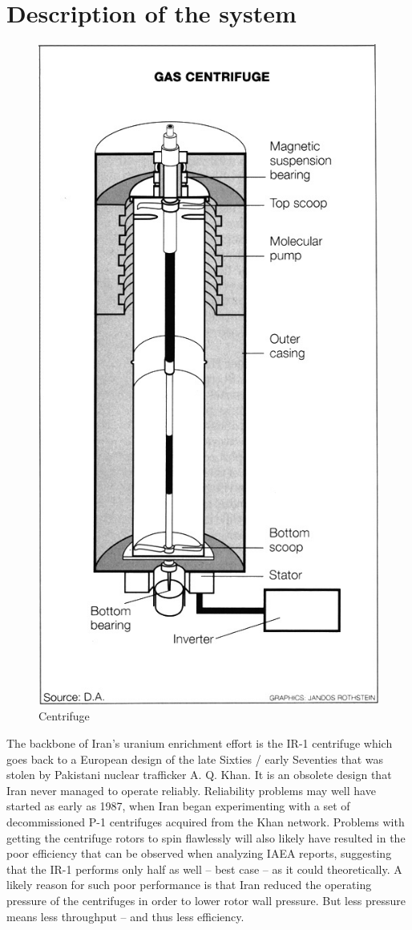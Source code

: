 \documentclass[12pt]{article}
\begin{document}
\section{Description of the system}
    \begin{figure}[H]
    \centering
    \includegraphics[height=0.65\textwidth]{figures/centrifugeAlternative.jpg}
    \caption{Centrifuge}
    \label{fig:centrifuge1}
    \end{figure}
The backbone of Iran’s uranium enrichment effort is the IR-1 centrifuge which goes back to a European design of the late Sixties / early Seventies that was stolen by Pakistani nuclear trafficker A. Q. Khan. It is an obsolete design that Iran never managed to operate reliably. Reliability problems may well have started as early as 1987, when Iran began experimenting with a set of decommissioned P-1 centrifuges acquired from the Khan network. Problems with getting the centrifuge rotors to spin flawlessly will also likely have resulted in the poor
efficiency that can be observed when analyzing IAEA reports, suggesting that the IR-1 performs only half as well – best case – as it could theoretically. A likely reason for such poor performance is that Iran reduced the operating pressure of the centrifuges in order to lower rotor wall pressure. But less pressure means less throughput – and thus less efficiency.
\end{document}

